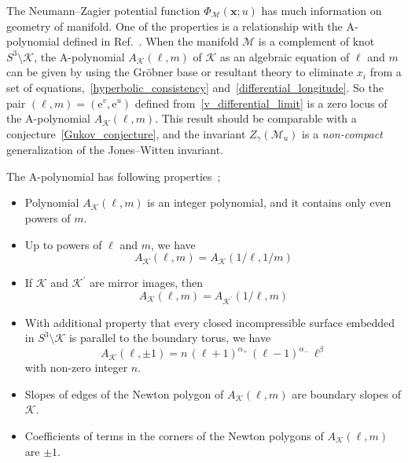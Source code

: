 \documentclass[12pt,reqno]{amsart}
\numberwithin{equation}{section}
\newcommand{\E}{\mathrm{e}}
\begin{document}
The Neumann--Zagier
potential function $\Phi_\mathcal{M}(\boldsymbol{x};u)$ has much 
information on geometry of manifold.
One of the properties
is  a relationship with the A-polynomial  defined in
Ref.~.
When the manifold $\mathcal{M}$ is a complement of knot
$S^3 \setminus \mathcal{K}$,
the A-polynomial 
$A_\mathcal{K}(\ell, m)$ of $\mathcal{K}$
as an algebraic equation of $\ell$ and $m$
can be given by using
the Gr\"obner
base or resultant theory to eliminate $x_i$ from a set of
equations,~\eqref{hyperbolic_consistency}
and~\eqref{differential_longitude}.
So the pair $(\ell,m)=(\E^v, \E^u)$ defined
from~\eqref{v_differential_limit}
is a zero locus of the A-polynomial $A_\mathcal{K}(\ell,m)$.
This result should be comparable with a
conjecture~\eqref{Gukov_conjecture}, and the invariant
$Z_\gamma(\mathcal{M}_u)$ is a \emph{non-compact} generalization of the
Jones--Witten invariant.


The A-polynomial has following
properties~\cite{CCGLS94a,CoopLong98a};
\begin{itemize}

\item Polynomial $A_\mathcal{K}(\ell,m)$ is an integer polynomial, and
  it  contains only even powers of $m$.

\item Up to powers of $\ell$ and $m$, we have
  \begin{equation}
    A_\mathcal{K}(\ell, m) =
    A_\mathcal{K}(1/\ell, 1/m)
  \end{equation}

\item If $\mathcal{K}$ and $\mathcal{K}^\prime$ are mirror images,
  then
  \begin{equation}
    A_\mathcal{K}(\ell, m)=
    A_{\mathcal{K}^\prime}(1/\ell, m) 
  \end{equation}

\item With additional property that every closed incompressible
  surface embedded in $S^3 \setminus \mathcal{K}$ is parallel to the
  boundary torus, we have
  \begin{equation}
    A_\mathcal{K}(\ell, \pm 1 )
    =
    n \, \left( \ell+1 \right)^{\alpha_+}
    \,
    \left( \ell - 1 \right)^{\alpha_-} \,
    \ell^\beta
  \end{equation}
  with non-zero integer $n$.


  \item Slopes of edges of the Newton polygon of
    $A_\mathcal{K}(\ell,m)$ are boundary slopes of $\mathcal{K}$.


  \item Coefficients of terms in the corners of the Newton polygons of
    $A_\mathcal{K}(\ell,m)$ are $\pm 1$.

\end{itemize}
\end{document}
